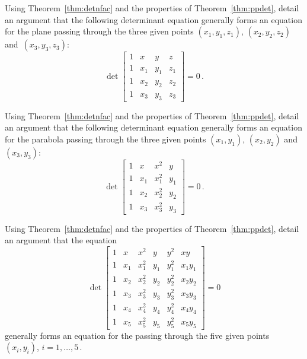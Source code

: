 





\begin{exercise} \label{ex:} 
Using Theorem~\ref{thm:detnfac} and the properties of Theorem~\ref{thm:ppdet}, detail an argument that the following determinant equation generally forms an equation for the plane passing through the three given points \((x_1,y_1,z_1)\), \((x_2,y_2,z_2)\) and~\((x_3,y_3,z_3)\):
\begin{equation*}
\det\begin{bmatrix} 1&x&y&z
\\1&x_1&y_1&z_1
\\1&x_2&y_2&z_2
\\1&x_3&y_3&z_3 \end{bmatrix}=0\,.
\end{equation*}

\end{exercise}



\begin{exercise} \label{ex:} 
Using Theorem~\ref{thm:detnfac} and the properties of Theorem~\ref{thm:ppdet}, detail an argument that the following determinant equation generally forms an equation for the parabola passing through the three given points \((x_1,y_1)\), \((x_2,y_2)\) and~\((x_3,y_3)\):
\begin{equation*}
\det\begin{bmatrix} 1&x&x^2&y
\\1&x_1&x_1^2&y_1
\\1&x_2&x_2^2&y_2
\\1&x_3&x_3^2&y_3 \end{bmatrix}=0\,.
\end{equation*}
\end{exercise}






\begin{exercise} \label{ex:} 
Using Theorem~\ref{thm:detnfac} and the properties of Theorem~\ref{thm:ppdet}, detail an argument that the equation
\begin{equation*}
\det\begin{bmatrix} 1&x&x^2&y&y^2&xy
\\1&x_1&x_1^2&y_1&y_1^2&x_1y_1
\\1&x_2&x_2^2&y_2&y_2^2&x_2y_2
\\1&x_3&x_3^2&y_3&y_3^2&x_3y_3 
\\1&x_4&x_4^2&y_4&y_4^2&x_4y_4 
\\1&x_5&x_5^2&y_5&y_5^2&x_5y_5 
\end{bmatrix}=0
\end{equation*}
generally forms an equation for the  passing through the five given points \((x_i,y_i)\), \(i=1,\ldots,5\)\,.
\end{exercise}









\begin{comment}%
why, what caused X?
how did X occur?
what-if? what-if-not?
how does X compare with Y?
what is the evidence for X?
why is X important?
\end{comment}


